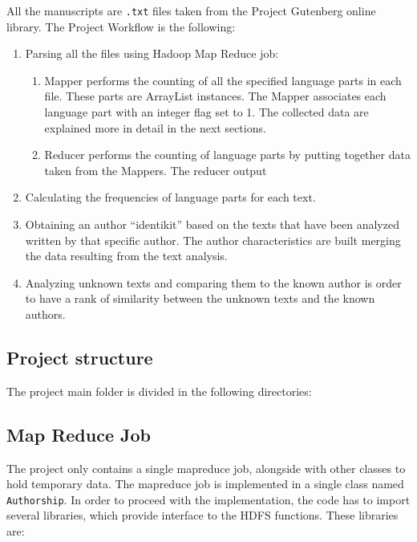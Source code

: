 \documentclass[a4paper,11pt, twoside]{article}
\begin{document}
	All the manuscripts are \texttt{.txt} files taken from the Project Gutenberg\parencite{Gutenberg} online library.
	The Project Workflow is the following:
	\begin{enumerate}
		\item Parsing all the files using Hadoop Map Reduce job: 
		\begin{enumerate}
			\item Mapper performs the counting of all the specified language parts in each file. These parts are ArrayList instances. The Mapper associates each language part with an integer flag set to 1. The collected data are explained more in detail in the next sections. 
			
			\item Reducer performs the counting of language parts by putting together data taken from the Mappers. The reducer output  
		\end{enumerate}
		\item Calculating the frequencies of language parts for each text.
		\item Obtaining an author ``identikit'' based on the texts that have been analyzed written by that specific author. The author characteristics are built merging the data resulting from the text analysis.
		\item Analyzing unknown texts and comparing them to the known author is order to have a rank of similarity between the unknown texts and the known authors.
	\end{enumerate}

	\subsection{Project structure}
	The project main folder is divided in the following directories:
	\begin{figure}[h!]
	\end{figure}

	\subsection{Map Reduce Job}
	The project only contains a single mapreduce job, alongside with other classes to hold temporary data. The mapreduce job is implemented in a single class named \lstinline|Authorship|. In order to proceed with the implementation, the code has to import several libraries, which provide interface to the HDFS functions. These libraries are:
	\begin{figure}[h!]
	\end{figure}
\end{document}
